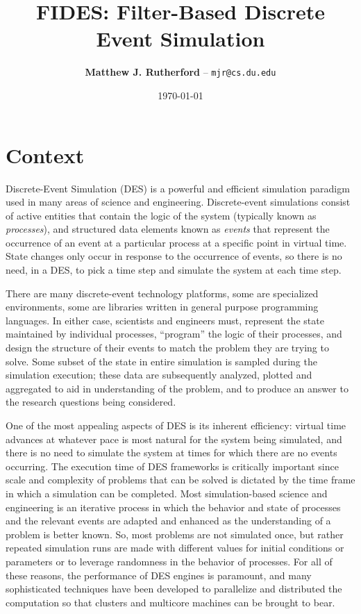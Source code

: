 \documentclass[10pt,notitlepage]{article}
\title{FIDES: Filter-Based Discrete Event Simulation}
\author{\textbf{Matthew J. Rutherford} -- \texttt{mjr@cs.du.edu}}
\date{\today}
\begin{document}
\lstset{language=Java}
\lstset{basicstyle=\small}
\lstset{frame=single}

\maketitle

\section{Context}

Discrete-Event Simulation (DES) is a powerful and efficient simulation
paradigm used in many areas of science and engineering.
Discrete-event simulations consist of active entities that contain the
logic of the system (typically known as \emph{processes}), and
structured data elements known as \emph{events} that represent the
occurrence of an event at a particular process at a specific point in
virtual time.  State changes only occur in response to the occurrence
of events, so there is no need, in a DES, to pick a time step and
simulate the system at each time step.

There are many discrete-event technology platforms,
some are specialized environments, some are libraries written in
general purpose programming languages.  In either case, scientists and
engineers must, represent the state maintained by individual
processes, ``program'' the logic of their processes, and design the
structure of their events to match the problem they are trying to
solve.  Some subset of the state in entire simulation is sampled
during the simulation execution; these data are subsequently analyzed,
plotted and aggregated to aid in understanding of the problem, and to
produce an answer to the research questions being considered.

One of the most appealing aspects of DES is its inherent efficiency:
virtual time advances at whatever pace is most natural for the system
being simulated, and there is no need to simulate the system at times
for which there are no events occurring.  The execution time of DES
frameworks is critically important since scale and complexity of
problems that can be solved is dictated by the time frame in which a
simulation can be completed.  Most simulation-based science and
engineering is an iterative process in which the behavior and state of
processes and the relevant events are adapted and enhanced as the
understanding of a problem is better known.  So, most problems are not
simulated once, but rather repeated simulation runs are made with
different values for initial conditions or parameters or to leverage
randomness in the behavior of processes.  For all of these reasons,
the performance of DES engines is paramount, and many sophisticated
techniques have been developed to parallelize and distributed the
computation so that clusters and multicore machines can be brought to
bear.
\end{document}

